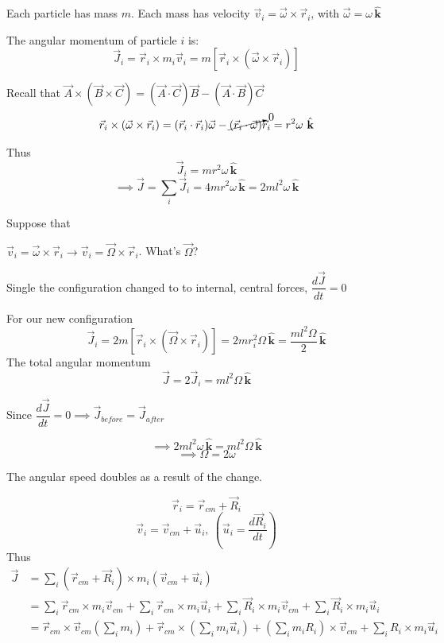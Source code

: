\documentclass[twoside]{scrartcl}
\let\oldhat\hat
\renewcommand{\hat}[1]{\,\oldhat{\boldsymbol{\mathbf{#1}}}}
\begin{document}
\begin{example}
\vspace*{50pt}

Each particle has mass $m$. Each mass has velocity $\vec{v}_i = \vec{\omega} \times \vec{r}_i$, with $\vec{\omega} = \omega\hat{k}$	

The angular momentum of particle $i$ is:
\[\vec{J}_i = \vec{r}_i \times m_i\vec{v}_i = m[\vec{r}_i \times (\vec{\omega} \times \vec{r}_i)]\]

Recall that $\vec{A} \times (\vec{B} \times \vec{C}) = (\vec{A}\cdot\vec{C})\vec{B} - (\vec{A}\cdot\vec{B})\vec{C}$
\[\vec{r}_i \times (\vec{\omega} \times \vec{r}_i) = (\vec{r}_i \cdot \vec{r}_i)\vec{\omega} - \cancelto{0}{(\vec{r}_i \cdot \vec{\omega})}\vec{r}_i = r^2\omega\hat{k}\]

Thus 
\[\vec{J}_i = mr^2\omega\hat{k}\]
\[\implies \vec{J} = \sum_i \vec{J}_i = 4mr^2\omega\hat{k} = 2ml^2\omega\hat{k}\]

Suppose that 
\vspace*{50pt}

$\vec{v}_i = \vec{\omega} \times \vec{r}_i \longrightarrow \vec{v}_i = \vec{\Omega} \times\vec{r}_i$. What's $\vec{\Omega}$?

Single the configuration changed to to internal, central forces, $\dfrac{d\vec{J}}{dt} = 0$

For our new configuration
\[\vec{J}_i = 2m[\vec{r}_i \times (\vec{\Omega} \times \vec{r}_i)] = 2mr_i^2\Omega\hat{k} = \frac{ml^2\Omega}{2}\hat{k}\]
The total angular momentum
\[\vec{J} = 2\vec{J}_i = ml^2\Omega\hat{k}\]

Since $\dfrac{d\vec{J}}{dt} = 0 \implies \vec{J}_{before} = \vec{J}_{after}$

\[\implies 2ml^2\omega\hat{k}= ml^2\Omega\hat{k}\]
\[\implies \Omega = 2\omega\]

The angular speed doubles as a result of the change. 
\end{example}

\pagebreak



\[\vec{r}_i = \vec{r}_{cm} + \vec{R}_i\]
\[\vec{v}_i = \vec{v}_{cm} + \vec{u}_i,~\left(\vec{u}_i = \frac{d\vec{R}_i}{dt}\right)\]
Thus
\[\begin{aligned}
\vec{J} &= \sum_i (\vec{r}_{cm} + \vec{R}_i) \times m_i(\vec{v}_{cm} + \vec{u}_i)\\
&= \sum_i \vec{r}_{cm} \times m_i\vec{v}_{cm} + \sum_i \vec{r}_{cm} \times m_i\vec{u}_i + \sum_i \vec{R}_i \times m_i\vec{v}_{cm} + \sum_i \vec{R}_i \times m_i\vec{u}_i\\
&= \vec{r}_{cm}\times \vec{v}_{cm}(\sum_i m_i) + \vec{r}_{cm} \times (\sum_i m_i\vec{u}_i) + (\sum_im_iR_i)\times\vec{v}_{cm} + \sum_iR_i\times m_i\vec{u}_i
\end{aligned}
\]
\end{document}
